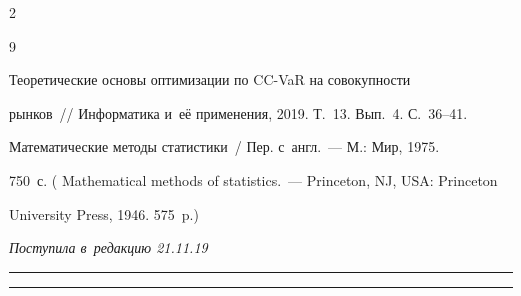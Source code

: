 \begin{multicols}{2}
{{\begin{thebibliography}{9}


   Теоретические основы оптимизации по CC-VaR на совокупности 


рынков~// Информатика и~её применения, 2019. Т.~13. Вып.~4. С.~36--41.




   Математические методы статистики~/ Пер. с~англ.~--- М.: Мир, 1975. 


750~с. ( Mathematical methods of statistics.~--- Princeton, NJ, USA: Princeton 


University Press, 1946. 575~p.)


 \end{thebibliography}





 }


 }





\end{multicols}





\vspace*{-9pt}





\hfill{\small\textit{Поступила в~редакцию 21.11.19}}





\vspace*{8pt}




















\hrule





\vspace*{2pt}





\hrule





